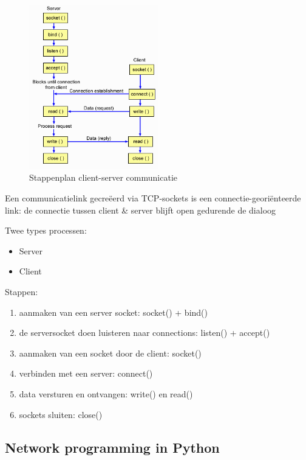 \documentclass{article}
\begin{document}
\begin{figure}[H]
    \centering
    \includegraphics[width=0.5\textwidth]{client-server-communicatie.png}
    \caption{Stappenplan client-server communicatie}
\end{figure}

Een communicatielink gecreëerd via TCP-sockets is een connectie-georiënteerde link: 
de connectie tussen client \& server blijft open gedurende de dialoog

Twee types processen:

\begin{itemize}
    \item Server
    \item Client
\end{itemize}

Stappen:

\begin{enumerate}
    \item aanmaken van een server socket: socket() + bind()
    \item de serversocket doen luisteren naar connections: listen() + accept()
    \item aanmaken van een socket door de client: socket()
    \item verbinden met een server: connect()
    \item data versturen en ontvangen: write() en read()
    \item sockets sluiten: close()
\end{enumerate}

\subsection{Network programming in Python}
\end{document}
